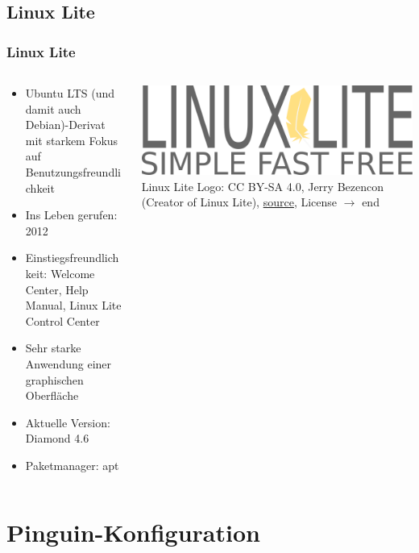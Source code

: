 \documentclass[9pt]{beamer}
\begin{document}
\subsection{Linux Lite}
\begin{frame}
 \frametitle{Linux Lite}
 \begin{columns} 
    \begin{column}[c]{0.6\textwidth}

	\begin{itemize}
		\item Ubuntu LTS (und damit auch Debian)-Derivat mit starkem Fokus auf Benutzungsfreundlichkeit
		\item Ins Leben gerufen: 2012
		\item Einstiegsfreundlichkeit: Welcome Center, Help Manual, Linux Lite Control Center 
		\item Sehr starke Anwendung einer graphischen Oberfläche
		\item Aktuelle Version: Diamond 4.6
		\item Paketmanager: apt
	\end{itemize}
	\end{column}
	
	\begin{column}{0.4\textwidth}
    \includegraphics[width=1.0\textwidth]{assets/linuxlite.png}
    Linux Lite Logo: CC BY-SA 4.0, Jerry Bezencon (Creator of Linux Lite), \href{https://commons.wikimedia.org/wiki/File:Linux_Lite_Simple_Fast_Free_logo.png}{source}, License $\rightarrow$ end
	\end{column}

 \end{columns}
\end{frame}

\section{Pinguin-Konfiguration}
\end{document}
